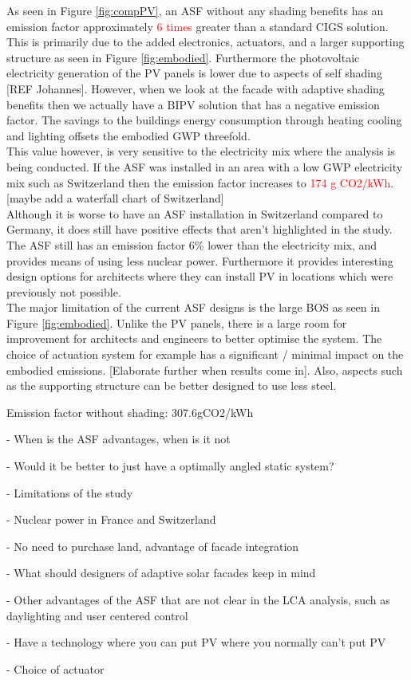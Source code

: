 


As seen in Figure \ref{fig:compPV}, an ASF without any shading benefits has an emission factor approximately \textcolor{red}{6 times } greater than a standard CIGS solution. This is primarily due to the added electronics, actuators, and a larger supporting structure as seen in Figure \ref{fig:embodied}. Furthermore the photovoltaic electricity generation of the PV panels is lower due to aspects of self shading [REF Johannes]. However, when we look at the facade with adaptive shading benefits then we actually have a BIPV solution that has a negative emission factor. The savings to the buildings energy consumption through heating cooling and lighting offsets the embodied GWP threefold. \\

This value however, is very sensitive to the electricity mix where the analysis is being conducted. If the ASF was installed in an area with a low GWP electricity mix such as Switzerland then the emission factor increases to \textcolor{red}{174 g CO2/kWh}. \\

[maybe add a waterfall chart of Switzerland]\\

Although it is worse to have an ASF installation in Switzerland compared to Germany, it does still have positive effects that aren't highlighted in the study. The ASF still has an emission factor 6\% lower than the electricity mix, and provides means of using less nuclear power. Furthermore it provides interesting design options for architects where they can install PV in locations which were previously not possible.  \\

The major limitation of the current ASF designs is the large BOS as seen in Figure \ref{fig:embodied}. Unlike the PV panels, there is a large room for improvement for architects and engineers to better optimise the system. The choice of actuation system for example has a significant / minimal impact on the embodied emissions. [Elaborate further when results come in]. Also, aspects such as the supporting structure can be better designed to use less steel.





Emission factor without shading: 307.6gCO2/kWh

- When is the ASF advantages, when is it not

- Would it be better to just have a optimally angled static system?

- Limitations of the study

- Nuclear power in France and Switzerland

- No need to purchase land, advantage of facade integration

- What should designers of adaptive solar facades keep in mind 

- Other advantages of the ASF that are not clear in the LCA analysis, such as daylighting and user centered control 

- Have a technology where you can put PV where you normally can't put PV

- Choice of actuator